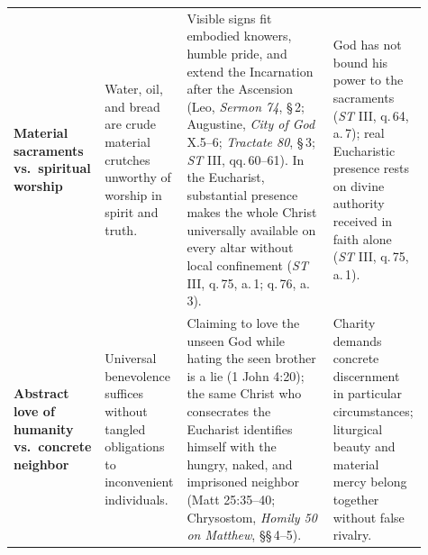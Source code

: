 \begin{longtable}{>{\raggedright\arraybackslash}p{0.17\linewidth}>{\raggedright\arraybackslash}p{0.19\linewidth}>{\raggedright\arraybackslash}p{0.35\linewidth}>{\raggedright\arraybackslash}p{0.20\linewidth}}
\textbf{Material sacraments vs.\ spiritual worship} &
Water, oil, and bread are crude material crutches unworthy of worship in spirit and truth. &
Visible signs fit embodied knowers, humble pride, and extend the Incarnation after the Ascension (Leo, \textit{Sermon 74}, \S\,2; Augustine, \textit{City of God} X.5--6; \textit{Tractate 80}, \S\,3; \textit{ST} III, qq.\,60--61). In the Eucharist, substantial presence makes the whole Christ universally available on every altar without local confinement (\textit{ST} III, q.\,75, a.\,1; q.\,76, a.\,3). &
God has not bound his power to the sacraments (\textit{ST} III, q.\,64, a.\,7); real Eucharistic presence rests on divine authority received in faith alone (\textit{ST} III, q.\,75, a.\,1). \\[0.4em]

\textbf{Abstract love of humanity vs.\ concrete neighbor} &
Universal benevolence suffices without tangled obligations to inconvenient individuals. &
Claiming to love the unseen God while hating the seen brother is a lie (1 John 4:20); the same Christ who consecrates the Eucharist identifies himself with the hungry, naked, and imprisoned neighbor (Matt 25:35--40; Chrysostom, \textit{Homily 50 on Matthew}, \S\S\,4--5). &
Charity demands concrete discernment in particular circumstances; liturgical beauty and material mercy belong together without false rivalry. \\
\end{longtable}
\endgroup
